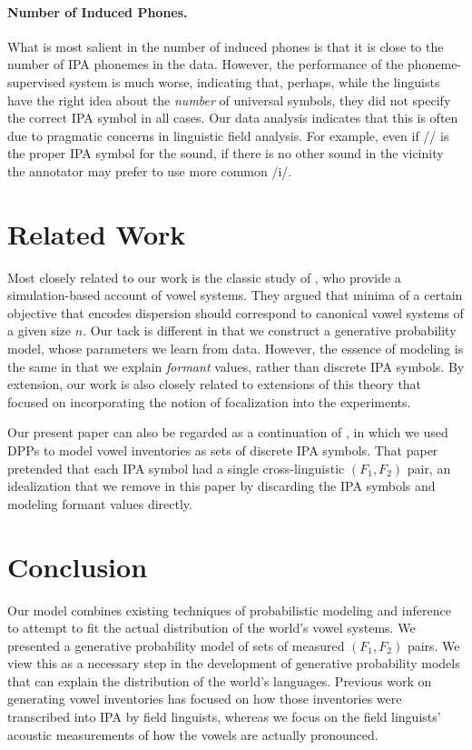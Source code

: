 \documentclass[11pt,a4paper]{article}
\begin{document}
\paragraph{Number of Induced Phones.}
What is most salient in the number of induced phones
is that it is close to the number of IPA phonemes
in the data. However,
the performance of the phoneme-supervised system is much worse,
indicating that, perhaps, while the linguists have the right
idea about the \emph{number} of universal symbols, they did not specify the correct IPA symbol in all cases. Our data analysis indicates
that this is often due to pragmatic concerns in linguistic field analysis. For example, even if // is the proper IPA symbol for the sound, if there is no other sound in the vicinity
the annotator may prefer to use more common /i/.

\section{Related Work}
Most closely related to our work is the classic study of
, who provide a simulation-based
account of vowel systems.
They argued that minima of a certain objective that encodes dispersion
should correspond to canonical vowel systems of a given size $n$. Our
tack is different in that we construct a generative probability model,
whose parameters we learn from data. However, the essence of modeling
is the same in that we explain \emph{formant} values, rather than
discrete IPA symbols. By extension, our work is also closely related
to extensions of this theory
\cite{schwartz1997dispersion,roark2001explaining} that focused on
incorporating the notion of focalization into the experiments.

Our present paper can also be regarded as a continuation of
, in which we used DPPs to
model vowel inventories as sets of discrete IPA symbols.  That paper
pretended that each IPA symbol had a single cross-linguistic
$(F_1,F_2)$ pair, an idealization that we remove in this paper by
discarding the IPA symbols and modeling formant values directly.

\section{Conclusion}

Our model combines existing techniques of probabilistic modeling and
inference to attempt to fit the actual distribution of the world's
vowel systems.  We presented a generative probability model of sets of
measured $(F_1,F_2)$ pairs.  We view this as a necessary step in the
development of generative probability models that can explain the
distribution of the world's languages.  Previous work on generating
vowel inventories has focused on how those inventories were
transcribed into IPA by field linguists, whereas we focus on the field
linguists' acoustic measurements of how the vowels are actually
pronounced.
\end{document}
